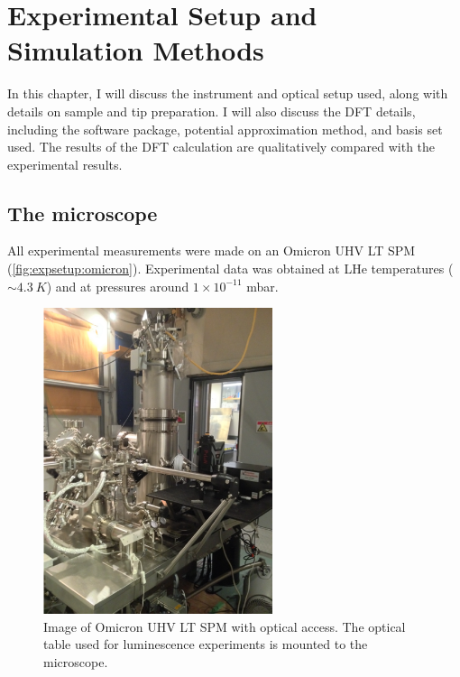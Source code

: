 
\chapter{Experimental Setup and Simulation Methods}
\label{ch:expsetup}

In this chapter, I will discuss the instrument and optical setup used, along with details on sample and tip preparation. I will also discuss the \ac{DFT} details, including the software package, potential approximation method, and basis set used. The results of the \ac{DFT} calculation are qualitatively compared with the experimental results.


\section{The microscope}

All experimental measurements were made on an Omicron \ac{UHV} \ac{LT} \ac{SPM} (\autoref{fig:expsetup:omicron}). Experimental data was obtained at \ac{LHe} temperatures ($\sim \SI{4.3}{K}$) and at pressures around $1 \times 10^{-11}$ mbar. 

\begin{figure} [h]
    \centering
    \includegraphics[width=0.6\textwidth]{pictures/microscope.png}
    \caption{Image of Omicron UHV LT SPM with optical access. The optical table used for luminescence experiments is mounted to the microscope.}
    \label{fig:expsetup:omicron}
\end{figure}

